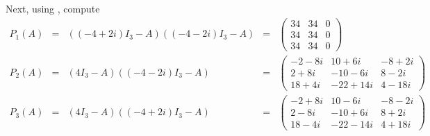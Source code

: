 Next, using \Matlabp, compute
\[
\begin{array}{rcccl}
P_1(A) & = & ((-4+2i)I_3-A)((-4-2i)I_3-A) & = & 
\left(\begin{array}{rrr}  
     34    &       34    &        0 \\     
     34    &       34    &        0 \\     
     34    &       34    &        0      
\end{array}\right) \\
P_2(A) & = & (4I_3-A)((-4-2i)I_3-A) & = &  
\left(\begin{array}{rrr}
     -2  - 8i     &   10  +  6i  &  -8  +  2i \\     
      2  + 8i     &  -10  -  6i  &   8  -  2i \\     
     18  + 4i     &  -22  + 14i  &   4  - 18i       
\end{array}\right) \\
P_3(A) & = & (4I_3-A)((-4+2i)I_3-A) & = & 
\left(\begin{array}{rrr}
     -2  + 8i     &   10  -  6i  &  -8  -  2i \\      
      2  - 8i     &  -10  +  6i  &   8  +  2i \\   
     18  - 4i     &  -22  - 14i  &   4  + 18i    
\end{array}\right)
\end{array}
\]


